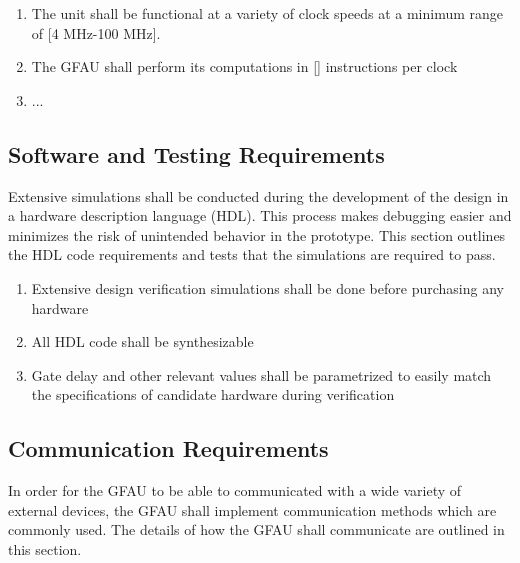 \documentclass[paper=usletter, fontsize=12pt]{article}
\begin{document}
        \begin{enumerate}

            \item The unit shall be functional at a variety of clock speeds at a minimum range of [4 MHz-100 MHz].

            \item The GFAU shall perform its computations in [] instructions per clock

            \item ...

        \end{enumerate}

        \subsection{Software and Testing Requirements}
        Extensive simulations shall be conducted during the development of the design in a hardware description language (HDL). This process makes debugging easier and minimizes the risk of unintended behavior in the prototype. This section outlines the HDL code requirements and tests that the simulations are required to pass.

        \begin{enumerate}

            \item Extensive design verification simulations shall be done before purchasing any hardware

            \item All HDL code shall be synthesizable

            \item Gate delay and other relevant values shall be parametrized to easily match the specifications of candidate hardware during verification

        \end{enumerate}

        \subsection{Communication Requirements}
        In order for the GFAU to be able to communicated with a wide variety of external devices, the GFAU shall implement communication methods which are commonly used. The details of how the GFAU shall communicate are outlined in this section.
\end{document}
